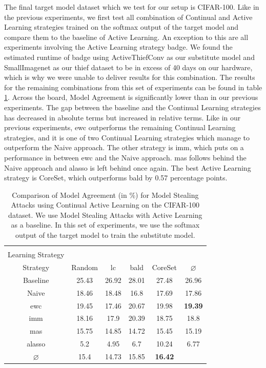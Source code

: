 The final target model dataset which we test for our setup is CIFAR-100. Like in the previous experiments, we first test all combination of Continual and Active Learning strategies trained on the softmax output of the target model
and compare them to the baseline of Active Learning. An exception to this are all experiments involving the Active Learning strategy \gls{badge}. We found the estimated runtime of \gls{badge} using ActiveThiefConv as our substitute model and SmallImagenet as our thief dataset
to be in excess of 40 days on our hardware, which is why we were unable to deliver results for this combination. The results for the remaining combinations from this set of experiments can be found in table \ref{fig:ModelStealingCIFAR100Softmax}.
Across the board, Model Agreement is significantly lower than in our previous experiments. The gap between the baseline and the Continual Learning strategies has decreased in absolute terms but increased in relative terms. Like in our previous experiments, \gls{ewc} outperforms
the remaining Continual Learning strategies, and it is one of two Continual Learning strategies which manage to outperform the Naive approach. The other strategy is \gls{imm}, which puts on a performance in between \gls{ewc} and the Naive approach. \gls{mas} follows behind the Naive approach
and \gls{alasso} is left behind once again. The best Active Learning strategy is CoreSet, which outperforms \gls{bald} by 0.57 percentage points. \par

\begin{table}[h]
    \centering
    \begin{tabular}{c | c c c c | c} 
        \hline
        \diagbox[width=11em]{Active \\ Learning Strategy}{Continual Learning \\ Strategy} & Random & \gls{lc} & \gls{bald} & CoreSet & $\varnothing$\\ 
        \hline 
        Baseline & 25.43 & 26.92 & 28.01 & 27.48 & 26.96 \\
        \hline
        Naive & 18.46 & 18.48 & 16.8 & 17.69 & 17.86\\
        \gls{ewc} & 19.45 & 17.46 & 20.67 & 19.98 & \textbf{19.39}\\
        \gls{imm} & 18.16 & 17.9 & 20.39 & 18.75 & 18.8\\
        \gls{mas} & 15.75 & 14.85 & 14.72 & 15.45 & 15.19\\
        \gls{alasso} & 5.2 & 4.95 & 6.7 & 10.24 & 6.77\\
        \hline
        $\varnothing$ & 15.4 & 14.73 & 15.85 & \textbf{16.42}\\
        \hline
    \end{tabular}
    \caption[Model agreement of Continual Learning strategies on CIFAR-100 using softmax output]{Comparison of Model Agreement (in \%) for Model Stealing Attacks using Continual Active Learning on the CIFAR-100 dataset. We use Model Stealing Attacks with Active Learning as a baseline.
    In this set of experiments, we use the softmax output of the target model to train the substitute model.}
    \label{fig:ModelStealingCIFAR100Softmax}
\end{table}

